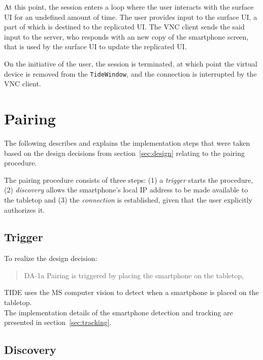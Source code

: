 At this point, the session enters a loop where the user interacts with the surface UI for an undefined amount of time.
The user provides input to the surface UI, a part of which is destined to the replicated UI.
The VNC client sends the said input to the server, who responds with an new copy of the smartphone screen, that is used by the surface UI to update the replicated UI.

On the initiative of the user, the session is terminated, at which point the virtual device is removed from the \texttt{TideWindow}, and the connection is interrupted by the VNC client.


\section{Pairing}
\label{sec:pairing}

The following describes and explains the implementation steps that were taken based on the design decisions from section~\ref{sec:design} relating to the pairing procedure.


The pairing procedure consists of three steps:
(1) a \emph{trigger} starts the procedure,
(2) \emph{discovery} allows the smartphone's local IP address to be made available to the tabletop and
(3) the \emph{connection} is established, given that the user explicitly authorizes it.

\subsection{Trigger}

To realize the design decision:
\begin{quote}
DA-1a Pairing is triggered by placing the smartphone on the tabletop,
\end{quote}
TIDE uses the MS computer vision to detect when a smartphone is placed on the tabletop.
\\
\linebreak
The implementation details of the smartphone detection and tracking are presented in section~\ref{sec:tracking}.

\subsection{Discovery}


